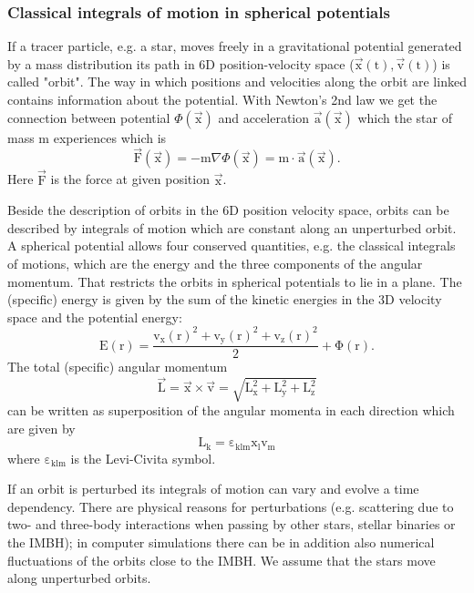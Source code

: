 \subsubsection{Classical integrals of motion in spherical potentials}\label{sec:iof}
If a tracer particle, e.g. a star, moves freely in a gravitational potential generated by a mass distribution its path in 6D position-velocity space (\(\vec{\mathrm{x}}(\mathrm{t}),\vec{\mathrm{v}}(\mathrm{t})\)) is called "orbit".
The way in which positions and velocities along the orbit are linked contains information about the potential. With Newton's 2nd law we get the connection between potential \(\Phi(\vec{\mathrm{x}})\) and acceleration \(\vec{\mathrm{a}}(\vec{\mathrm{x}})\) which the star of mass m experiences which is 
\begin{equation}\label{eq:Newton}
\vec{\mathrm{F}}(\vec{\mathrm{x}})=-\mathrm{m}\nabla\Phi(\vec{\mathrm{x}})=\mathrm{m}\cdot\vec{\mathrm{a}}(\vec{\mathrm{x}}).  
\end{equation}
Here \(\vec{\mathrm{F}}\) is the force at given position \(\vec{\mathrm{x}}\).
\par Beside the description of orbits in the 6D position velocity space, orbits can be described by integrals of motion which are constant along an unperturbed orbit. A spherical potential allows four conserved quantities, e.g. the classical integrals of motions, which are the energy and the three components of the angular momentum. That restricts the orbits in spherical potentials to lie in a plane. The (specific) energy is given by the sum of the kinetic energies in the 3D velocity space and the potential energy:
\begin{equation}\label{eq:energy}
\mathrm{E(r)=\frac{v_x(r)^2+v_y(r)^2+v_z(r)^2}{2}+\Phi(r)}.
\end{equation}
The total (specific) angular momentum
\begin{equation}\label{eq:total_ang_mom}
\vec{\mathrm{L}}=\vec{\mathrm{x}}\times\vec{\mathrm{v}}=\sqrt{\mathrm{L_x^2+L_y^2+L_z^2}}
\end{equation}
can be written as superposition of the angular momenta in each direction which are given by 
\begin{equation}\label{eq:ang_mom}
\mathrm{L_k=\varepsilon_{klm}x_l v_m}
\end{equation}
where \(\mathrm{\varepsilon_{klm}}\) is the Levi-Civita symbol.  
\par If an orbit is perturbed its integrals of motion can vary and evolve a time dependency. There are physical reasons for perturbations (e.g. scattering due to two- and three-body interactions when passing by other stars, stellar binaries or the \ac{IMBH}); in computer simulations there can be in addition also numerical fluctuations of the orbits close to the \ac{IMBH}. We assume that the stars move along unperturbed orbits.
